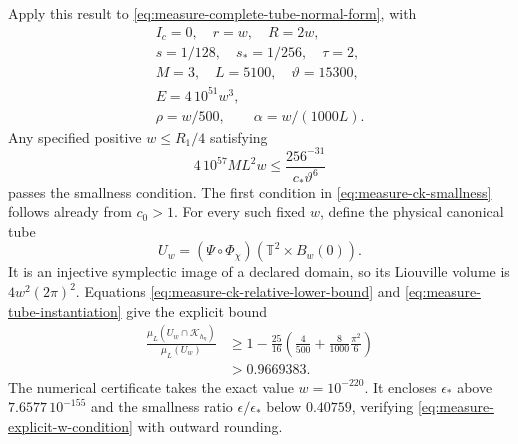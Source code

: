 Apply this result to \eqref{eq:measure-complete-tube-normal-form}, with
\begin{equation}
 \begin{gathered}
 I_c=0,\quad r=w,\quad R=2w,\\
 s=1/128,\quad s_*=1/256,\quad \tau=2,\\
 M=3,\quad L=5100,\quad\vartheta=15300,\\
 E=4\,10^{51}w^3,\\
 \rho=w/500,\qquad\alpha=w/(1000L).
 \end{gathered}
 \label{eq:measure-tube-instantiation}
\end{equation}
Any specified positive $w\leq R_1/4$ satisfying
\begin{equation}
 4\,10^{57}M L^2w
 \leq \frac{256^{-31}}{c_*\vartheta^6}
 \label{eq:measure-explicit-w-condition}
\end{equation}
passes the smallness condition. The first condition in
\eqref{eq:measure-ck-smallness} follows already from $c_0>1$.
For every such fixed $w$, define the physical canonical tube
\begin{equation}
 U_w=(\Psi\circ\Phi_\chi)
       (\mathbb T^2\times B_w(0)).
 \label{eq:measure-physical-tube}
\end{equation}
It is an injective symplectic image of a declared domain, so its
Liouville volume is $4w^2(2\pi)^2$. Equations
\eqref{eq:measure-ck-relative-lower-bound} and
\eqref{eq:measure-tube-instantiation} give the explicit bound
\begin{equation}
 \begin{aligned}
 \frac{\mu_L(U_w\cap\mathcal K_{h_\eta})}{\mu_L(U_w)}
 &\geq1-\frac{25}{16}
       \left(\frac4{500}+\frac8{1000}\frac{\pi^2}{6}\right)\\
 &>0.9669383.
 \end{aligned}
 \label{eq:measure-fixed-tube-percentage}
\end{equation}
The numerical certificate takes the exact value $w=10^{-220}$.
It encloses $\epsilon_*$ above $7.6577\,10^{-155}$ and the
smallness ratio $\epsilon/\epsilon_*$ below $0.40759$, verifying
\eqref{eq:measure-explicit-w-condition} with outward rounding.

